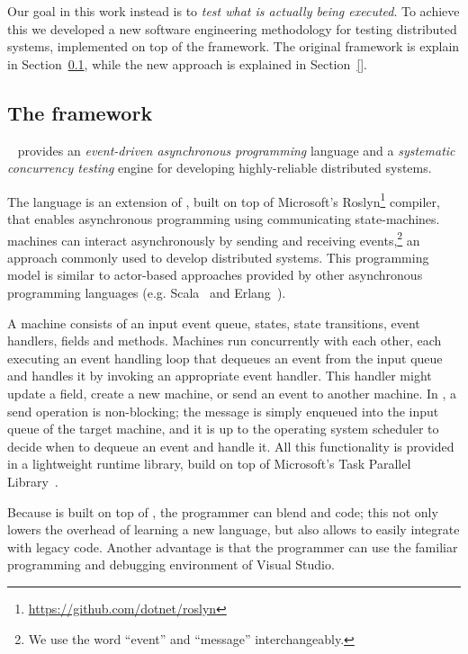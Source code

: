 Our goal in this work instead is to \emph{test what is actually being executed}. To achieve this we developed a new software engineering methodology for testing distributed systems, implemented on top of the \psharp framework. The original \psharp framework is explain in Section~\ref{sec:overview:psharp}, while the new approach is explained in Section~\ref{}.

\subsection{The \psharp framework}
\label{sec:overview:psharp}

\psharp~\cite{deligiannis2015psharp} provides an \emph{event-driven asynchronous programming} language and a \emph{systematic concurrency testing} engine for developing highly-reliable distributed systems.

The \psharp language is an extension of \csharp, built on top of Microsoft's Roslyn\footnote{\url{https://github.com/dotnet/roslyn}} compiler, that enables asynchronous programming using communicating state-machines. \psharp machines can interact asynchronously by sending and receiving events,\footnote{We use the word ``event'' and ``message'' interchangeably.} an approach commonly used to develop distributed systems. This programming model is similar to actor-based approaches provided by other asynchronous programming languages (e.g. Scala~\cite{odersky2008programming} and Erlang~\cite{armstrong1996erlang}).

A \psharp machine consists of an input event queue, states, state transitions, event handlers, fields and methods. Machines run concurrently with each other, each executing an event handling loop that dequeues an event from the input queue and handles it by invoking an appropriate event handler. This handler might update a field, create a new machine, or send an event to another machine. In \psharp, a send operation is non-blocking; the message is simply enqueued into the input queue of the target machine, and it is up to the operating system scheduler to decide when to dequeue an event and handle it. All this functionality is provided in a lightweight runtime library, build on top of Microsoft's Task Parallel Library~\cite{leijen2009tpl}.

Because \psharp is built on top of \csharp, the programmer can blend \psharp and \csharp code; this not only lowers the overhead of learning a new language, but also allows \psharp to easily integrate with legacy code. Another advantage is that the programmer can use the familiar programming and debugging environment of Visual Studio.


